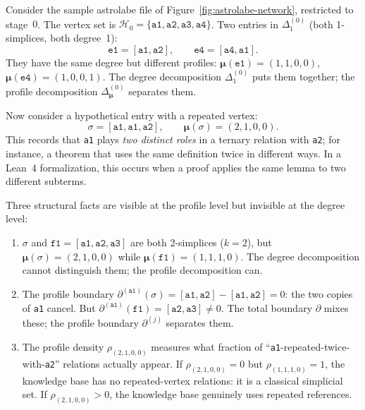 \begin{example}\label{ex:why-profiles}
Consider the sample astrolabe file of Figure~\ref{fig:astrolabe-network}, restricted to stage~$0$. The vertex set is $\mathcal{H}_0 = \{\texttt{a1}, \texttt{a2}, \texttt{a3}, \texttt{a4}\}$. Two entries in $\Delta_1^{(0)}$ (both 1-simplices, both degree~1):
\[
  \texttt{e1} = [\texttt{a1}, \texttt{a2}], \qquad
  \texttt{e4} = [\texttt{a4}, \texttt{a1}].
\]
They have the same degree but different profiles: $\boldsymbol{\mu}(\texttt{e1}) = (1, 1, 0, 0)$, $\boldsymbol{\mu}(\texttt{e4}) = (1, 0, 0, 1)$. The degree decomposition $\Delta_1^{(0)}$ puts them together; the profile decomposition $\Delta^{(0)}_{\boldsymbol{\mu}}$ separates them.

Now consider a hypothetical entry with a repeated vertex:
\[
  \sigma = [\texttt{a1}, \texttt{a1}, \texttt{a2}], \qquad
  \boldsymbol{\mu}(\sigma) = (2, 1, 0, 0).
\]
This records that \texttt{a1} plays \emph{two distinct roles} in a ternary relation with \texttt{a2}; for instance, a theorem that uses the same definition twice in different ways. In a Lean~4 formalization, this occurs when a proof applies the same lemma to two different subterms.

Three structural facts are visible at the profile level but invisible at the degree level:
\begin{enumerate}
\item $\sigma$ and $\texttt{f1} = [\texttt{a1}, \texttt{a2}, \texttt{a3}]$ are both 2-simplices ($k = 2$), but $\boldsymbol{\mu}(\sigma) = (2, 1, 0, 0)$ while $\boldsymbol{\mu}(\texttt{f1}) = (1, 1, 1, 0)$. The degree decomposition cannot distinguish them; the profile decomposition can.
\item The profile boundary $\partial^{(\texttt{a1})}(\sigma) = [\texttt{a1}, \texttt{a2}] - [\texttt{a1}, \texttt{a2}] = 0$: the two copies of \texttt{a1} cancel. But $\partial^{(\texttt{a1})}(\texttt{f1}) = [\texttt{a2}, \texttt{a3}] \neq 0$. The total boundary $\partial$ mixes these; the profile boundary $\partial^{(j)}$ separates them.
\item The profile density $\rho_{(2,1,0,0)}$ measures what fraction of ``\texttt{a1}-repeated-twice-with-\texttt{a2}'' relations actually appear. If $\rho_{(2,1,0,0)} = 0$ but $\rho_{(1,1,1,0)} = 1$, the knowledge base has no repeated-vertex relations: it is a classical simplicial set. If $\rho_{(2,1,0,0)} > 0$, the knowledge base genuinely uses repeated references.
\end{enumerate}
\end{example}

